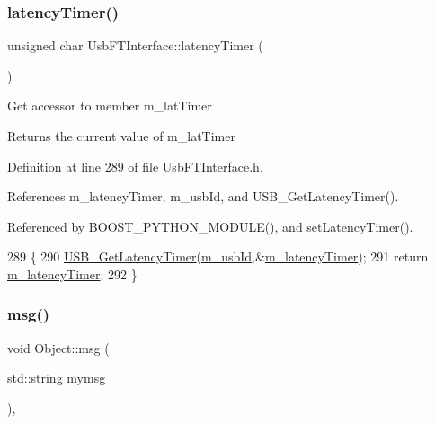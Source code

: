 \subsubsection{\texorpdfstring{latency\+Timer()}{latencyTimer()}}
{\footnotesize\ttfamily unsigned char Usb\+F\+T\+Interface\+::latency\+Timer (\begin{DoxyParamCaption}{ }\end{DoxyParamCaption})\hspace{0.3cm}{\ttfamily [inline]}}

Get accessor to member m\+\_\+lat\+Timer \begin{DoxyReturn}{Returns}
the current value of m\+\_\+lat\+Timer 
\end{DoxyReturn}


Definition at line 289 of file Usb\+F\+T\+Interface.\+h.



References m\+\_\+latency\+Timer, m\+\_\+usb\+Id, and U\+S\+B\+\_\+\+Get\+Latency\+Timer().



Referenced by B\+O\+O\+S\+T\+\_\+\+P\+Y\+T\+H\+O\+N\+\_\+\+M\+O\+D\+U\+L\+E(), and set\+Latency\+Timer().


\begin{DoxyCode}
289                                 \{
290     \hyperlink{LALUsbML_8h_a90c0ec96b211bb1b45c4b26afe6f6ced}{USB\_GetLatencyTimer}(\hyperlink{classUsbFTInterface_a91df5c0547e8be460bc087e27afe05aa}{m\_usbId},&\hyperlink{classUsbFTInterface_a0eefe6f2cee132da70176562cd126718}{m\_latencyTimer});
291     \textcolor{keywordflow}{return} \hyperlink{classUsbFTInterface_a0eefe6f2cee132da70176562cd126718}{m\_latencyTimer};
292   \}
\end{DoxyCode}
\mbox{\label{classObject_a58b2d0618c2d08cf2383012611528d97}} 
\subsubsection{\texorpdfstring{msg()}{msg()}\hspace{0.1cm}{\footnotesize\ttfamily [1/2]}}
{\footnotesize\ttfamily void Object\+::msg (\begin{DoxyParamCaption}\item[{std\+::string}]{mymsg }\end{DoxyParamCaption})\hspace{0.3cm}{\ttfamily [inline]}, {\ttfamily [inherited]}}



